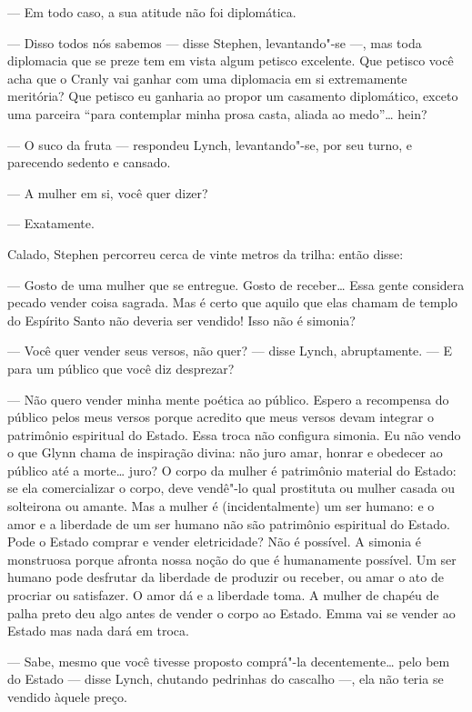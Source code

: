 --- Em todo caso, a sua atitude não foi diplomática.

--- Disso todos nós sabemos --- disse Stephen, levantando"-se ---,
mas toda diplomacia que se preze tem em vista algum petisco excelente. 
Que petisco você acha que o Cranly vai ganhar com uma diplomacia em si
extremamente meritória?  Que petisco eu ganharia ao propor um casamento
diplomático, exceto uma parceira “para contemplar minha prosa casta,
aliada ao medo”\ldots{} hein?

--- O suco da fruta --- respondeu Lynch, levantando"-se, por seu
turno, e parecendo sedento e cansado.

--- A mulher em si, você quer dizer?

--- Exatamente.

Calado, Stephen percorreu cerca de vinte metros da trilha: então
disse:

--- Gosto de uma mulher que se entregue.  Gosto de receber\ldots{} 
Essa gente considera pecado vender coisa sagrada.  Mas é certo que
aquilo que elas chamam de templo do Espírito Santo não deveria ser
vendido!  Isso não é simonia?

--- Você quer vender seus versos, não quer? --- disse Lynch,
abruptamente.  --- E para um público que você diz desprezar?

--- Não quero vender minha mente poética ao público.  Espero a
recompensa do público pelos meus versos porque acredito que meus versos
devam integrar o patrimônio espiritual do Estado.  Essa troca não
configura simonia.  Eu não vendo o que Glynn chama de inspiração
divina: não juro amar, honrar e obedecer ao público até a morte\ldots{}
juro?  O corpo da mulher é patrimônio material do Estado: \label{se"-ela} se ela
comercializar o corpo, deve vendê"-lo qual prostituta ou mulher casada
ou solteirona ou amante.  Mas a mulher é (incidentalmente) um ser
humano: e o amor e a liberdade de um ser humano não são patrimônio
espiritual do Estado.  Pode o Estado comprar e vender eletricidade? 
Não é possível.  A simonia é monstruosa porque afronta nossa noção do
que é humanamente possível.  Um ser humano pode desfrutar da liberdade
de produzir ou receber, ou amar o ato de procriar ou satisfazer.  O
amor dá e a liberdade toma.  A mulher de chapéu de palha preto deu
algo antes de vender o corpo ao Estado.  Emma vai se vender ao Estado
mas nada dará em troca.

--- Sabe, mesmo que você tivesse proposto comprá"-la
decentemente\ldots{} pelo bem do Estado --- disse Lynch, chutando pedrinhas do
cascalho ---, ela não teria se vendido àquele preço.


